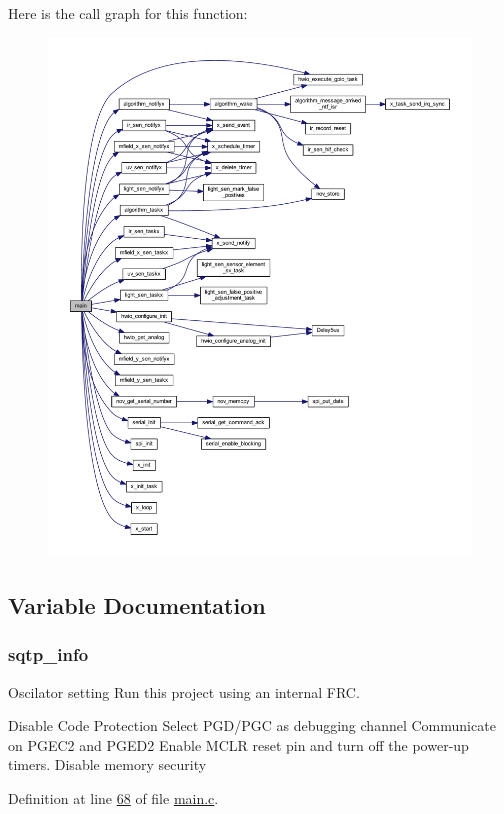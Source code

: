 Here is the call graph for this function\+:\nopagebreak
\begin{figure}[H]
\begin{center}
\leavevmode
\includegraphics[width=350pt]{d4/dca/a00048_a840291bc02cba5474a4cb46a9b9566fe_cgraph}
\end{center}
\end{figure}




\subsection{Variable Documentation}
\hypertarget{a00048_a4e1e8b365cce7a6d497671681eb5823c}{
\subsubsection[{sqtp\+\_\+info}]{ sqtp\+\_\+info}}\label{a00048_a4e1e8b365cce7a6d497671681eb5823c}


Oscilator setting Run this project using an internal F\+R\+C. 

Disable Code Protection Select P\+G\+D/\+P\+G\+C as debugging channel Communicate on P\+G\+E\+C2 and P\+G\+E\+D2 Enable M\+C\+L\+R reset pin and turn off the power-\/up timers. Disable memory security 

Definition at line \hyperlink{a00048_source_l00068}{68} of file \hyperlink{a00048_source}{main.\+c}.

